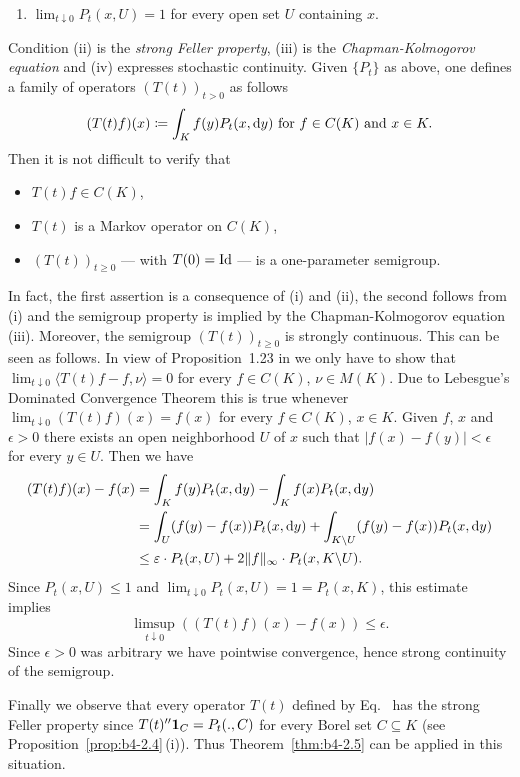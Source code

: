 \begin{example}
\begin{enumerate}[\upshape (i)]
    \item 
    $\lim_{t\downarrow0} P_t(x,U) = 1$ for every open set $U$ containing $x$.
\end{enumerate}
Condition (ii) is the \emph{strong Feller property}, (iii) is the \emph{Chapman-Kolmogorov equation} and (iv) expresses stochastic continuity.
Given $\{P_t\}$ as above, one defines a family of operators $(T(t))_{t>0}$ as follows
\begin{equation}\label{eq:b4-2.4}
    (T(t)f)(x)  \coloneq  \int_K f(y)P_t(x,\mathop{}\!\mathrm{d}{y})  \text{ for } f \in C(K)  \text{ and } x \in K .
\end{equation}
Then it is not difficult to verify that 
\begin{itemize}[-] 
    \item 
    $T(t)f \in C(K)$, 
    \item 
    $T(t)$ is a Markov operator on $C(K)$, 
    \item 
    $(T(t))_{t \geq 0}$ --- with $T(0) = \operatorname{Id} $ --- is a one-parameter semigroup.
\end{itemize}
In fact, the first assertion is a consequence of (i) and (ii), the second follows from (i) and the semigroup property is implied by the Chapman-Kolmogorov equation (iii).
Moreover, the semigroup $(T(t))_{t \geq 0}$ is strongly continuous.
This can be seen as follows. 
In view of Proposition~1.23 in \textcite{davies:1980} we only have
to show that $\lim_{t\downarrow 0}\langle T(t)f-f,\nu\rangle = 0$ for every $f \in C(K)$, $\nu \in M(K)$.
Due to Lebesgue's Dominated Convergence Theorem this is true whenever
$\lim_{t\downarrow0}(T(t)f)(x) = f(x)$ for every $f \in C(K)$, $x \in K$.
Given $f$, $x$
and $\epsilon > 0$ there exists an open neighborhood $U$ of\/ $x$ such that
$|f(x) - f(y)| < \epsilon$ for every $y \in U$.
Then we have
\begin{align*} 
    (T(t)f)(x) - f(x) &= \int_K f(y)P_t(x,\dy) - \int_K f(x)P_t(x,\dy) \\
    &= \int_U (f(y)-f(x))P_t(x,\dy) + \int_{K\backslash U} (f(y)-f(x))P_t(x,\dy)  \\
    &\leq \epsilon\cdot P_t(x,U) + 2\|f\|_{\infty}\cdot P_t(x,K\backslash U) .
\end{align*}
Since $P_t(x,U) \leq 1$ and $\lim_{t\downarrow0} P_t(x,U) = 1 = P_t(x,K)$, this estimate
implies %
\[
	\limsup_{t\downarrow 0}((T(t)f)(x) - f(x)) \leq \epsilon .
\]
%
Since $\epsilon > 0$ was arbitrary we have pointwise convergence, hence strong continuity of the semigroup.

Finally we observe that every operator $T(t)$ defined by Eq.~ has the
strong Feller property since $T(t)''\mathbf{1}_C = P_t(.,C)$ for every Borel set
$C \subseteq K$ (see Proposition~\ref{prop:b4-2.4}\,(i)).
Thus Theorem~\ref{thm:b4-2.5} can be applied in this situation.
\end{example}
